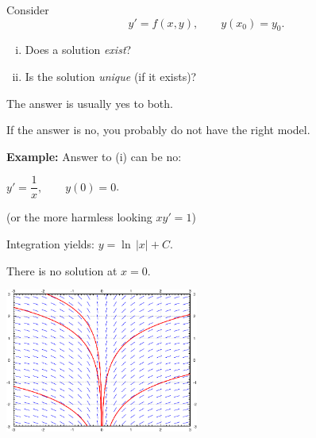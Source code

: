 \documentclass[10pt,aspectratio=169]{beamer}
\begin{document}
\begin{frame}
Consider
\begin{equation*}
y' = f(x,y), \qquad y(x_0) = y_0.
\end{equation*}
\begin{enumerate}[(i)]
\item\pause Does a solution \emph{exist}?
\item\pause Is the solution \emph{unique} (if it exists)?
\end{enumerate}

\medskip
\pause

The answer is usually yes to both.

\pause
If the answer is no, you probably do not have the right model.

\medskip
\pause

\textbf{Example:}
Answer to (i) can be no:
  
\quad $y' = \dfrac{1}{x}, \qquad y(0) = 0$.

\pause (or the more harmless
looking $x y' = 1$)

\medskip
\pause

Integration yields: $y = \ln \, \lvert x \rvert + C$. \quad

\pause
There is no solution at $x=0$.

\vspace*{-72pt}
\hspace*{3in}\includegraphics[width=2.5in]{../figures/1-3-xinv-sol}

\end{frame}
\end{document}

